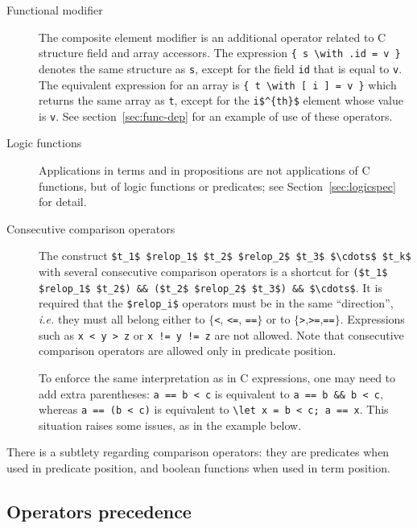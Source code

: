 \begin{description}
\item[Functional modifier]
  The composite element modifier is an additional
  operator related to C structure field and array accessors.
  The expression \lstinline|{ s \with .id = v }|
  denotes the same structure as \lstinline|s|, except for the field
  \lstinline|id| that is equal to \lstinline|v|.
  The equivalent expression for an array is
  \lstinline|{ t \with [ i ] = v }|
  which returns the same array as \lstinline|t|, except for the
  \lstinline|i$^{th}$| element whose value
  is \lstinline|v|.
  See section~\ref{sec:func-dep} for an example of use of these operators.

\item[Logic functions] Applications in terms and in propositions are not
applications of C functions, but of logic functions or predicates; see
Section~\ref{sec:logicspec} for detail.

\item[Consecutive comparison operators]
  The construct
\lstinline|$t_1$ $relop_1$ $t_2$ $relop_2$ $t_3$ $\cdots$ $t_k$| with
  several consecutive comparison operators is a shortcut for
  \lstinline|($t_1$ $relop_1$ $t_2$) && ($t_2$ $relop_2$ $t_3$) && $\cdots$|.
  It is required that the \lstinline|$relop_i$| operators must be in
  the same ``direction'', \emph{i.e.} they must all belong either to
  $\{$\lstinline|<|, \lstinline|<=|, \lstinline|==|$\}$ or to
  $\{$\lstinline|>|,\lstinline|>=|,\lstinline|==|$\}$. Expressions such as
  \lstinline|x < y > z| or \lstinline|x != y != z| are not allowed.
  Note that consecutive comparison operators are allowed only 
  in predicate position.

  To enforce the same interpretation as in C expressions, one may need
  to add extra parentheses: \lstinline|a == b < c| is equivalent
  to \lstinline|a == b && b < c|, whereas
  \lstinline |a == (b < c)| is
  equivalent to \lstinline|\let x = b < c; a == x|.
  This situation raises some issues, as in the example below.

\end{description}

There is a subtlety regarding comparison operators: they are
predicates when used in predicate position, and boolean functions when
used in term position.
\begin{example}

\end{example}

\subsection{Operators precedence}

